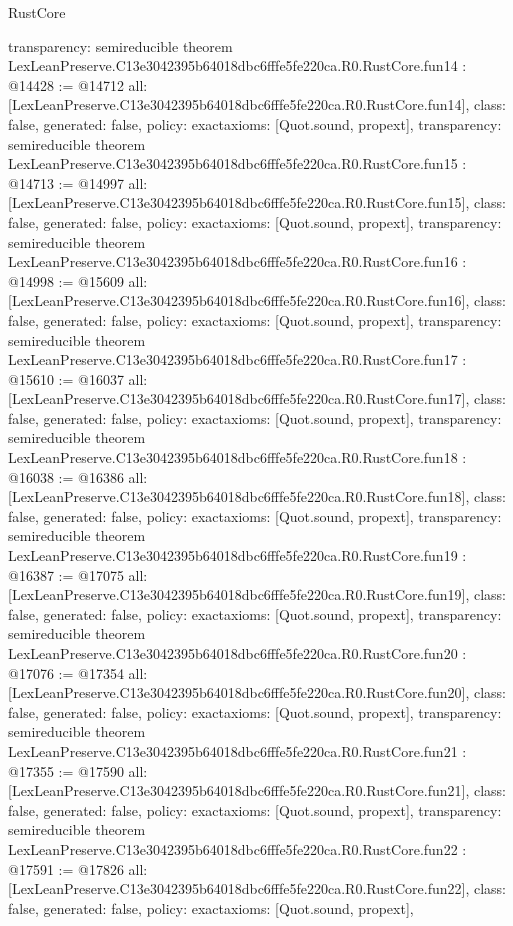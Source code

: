 \begin{lexlean}{RustCore}
\begin{coremodule}
{  transparency: semireducible
}
theorem LexLeanPreserve.C13e3042395b64018dbc6fffe5fe220ca.R0.RustCore.fun14 : @14428 := @14712 {
  all: [LexLeanPreserve.C13e3042395b64018dbc6fffe5fe220ca.R0.RustCore.fun14],
  class: false,
  generated: false,
  policy: exact{axioms: [Quot.sound, propext]},
  transparency: semireducible
}
theorem LexLeanPreserve.C13e3042395b64018dbc6fffe5fe220ca.R0.RustCore.fun15 : @14713 := @14997 {
  all: [LexLeanPreserve.C13e3042395b64018dbc6fffe5fe220ca.R0.RustCore.fun15],
  class: false,
  generated: false,
  policy: exact{axioms: [Quot.sound, propext]},
  transparency: semireducible
}
theorem LexLeanPreserve.C13e3042395b64018dbc6fffe5fe220ca.R0.RustCore.fun16 : @14998 := @15609 {
  all: [LexLeanPreserve.C13e3042395b64018dbc6fffe5fe220ca.R0.RustCore.fun16],
  class: false,
  generated: false,
  policy: exact{axioms: [Quot.sound, propext]},
  transparency: semireducible
}
theorem LexLeanPreserve.C13e3042395b64018dbc6fffe5fe220ca.R0.RustCore.fun17 : @15610 := @16037 {
  all: [LexLeanPreserve.C13e3042395b64018dbc6fffe5fe220ca.R0.RustCore.fun17],
  class: false,
  generated: false,
  policy: exact{axioms: [Quot.sound, propext]},
  transparency: semireducible
}
theorem LexLeanPreserve.C13e3042395b64018dbc6fffe5fe220ca.R0.RustCore.fun18 : @16038 := @16386 {
  all: [LexLeanPreserve.C13e3042395b64018dbc6fffe5fe220ca.R0.RustCore.fun18],
  class: false,
  generated: false,
  policy: exact{axioms: [Quot.sound, propext]},
  transparency: semireducible
}
theorem LexLeanPreserve.C13e3042395b64018dbc6fffe5fe220ca.R0.RustCore.fun19 : @16387 := @17075 {
  all: [LexLeanPreserve.C13e3042395b64018dbc6fffe5fe220ca.R0.RustCore.fun19],
  class: false,
  generated: false,
  policy: exact{axioms: [Quot.sound, propext]},
  transparency: semireducible
}
theorem LexLeanPreserve.C13e3042395b64018dbc6fffe5fe220ca.R0.RustCore.fun20 : @17076 := @17354 {
  all: [LexLeanPreserve.C13e3042395b64018dbc6fffe5fe220ca.R0.RustCore.fun20],
  class: false,
  generated: false,
  policy: exact{axioms: [Quot.sound, propext]},
  transparency: semireducible
}
theorem LexLeanPreserve.C13e3042395b64018dbc6fffe5fe220ca.R0.RustCore.fun21 : @17355 := @17590 {
  all: [LexLeanPreserve.C13e3042395b64018dbc6fffe5fe220ca.R0.RustCore.fun21],
  class: false,
  generated: false,
  policy: exact{axioms: [Quot.sound, propext]},
  transparency: semireducible
}
theorem LexLeanPreserve.C13e3042395b64018dbc6fffe5fe220ca.R0.RustCore.fun22 : @17591 := @17826 {
  all: [LexLeanPreserve.C13e3042395b64018dbc6fffe5fe220ca.R0.RustCore.fun22],
  class: false,
  generated: false,
  policy: exact{axioms: [Quot.sound, propext]},
}
\end{coremodule}
\end{lexlean}

